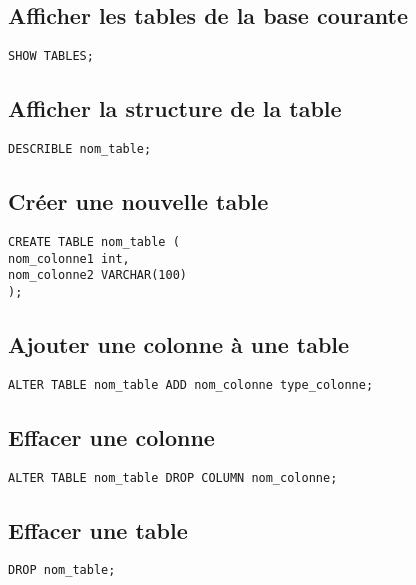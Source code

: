 \documentclass[11pt]{article}
\begin{document}
\subsection{Afficher les tables de la base courante}
\label{sec:orge465068}

\begin{verbatim}
SHOW TABLES;
\end{verbatim}

\subsection{Afficher la structure de la table}
\label{sec:org18c8266}

\begin{verbatim}
DESCRIBLE nom_table;
\end{verbatim}

\subsection{Créer une nouvelle table}
\label{sec:org65439d1}

\begin{verbatim}
CREATE TABLE nom_table (
nom_colonne1 int,
nom_colonne2 VARCHAR(100)
);
\end{verbatim}

\subsection{Ajouter une colonne à une table}
\label{sec:orgebeb21c}
\begin{verbatim}
ALTER TABLE nom_table ADD nom_colonne type_colonne;
\end{verbatim}

\subsection{Effacer une colonne}
\label{sec:org12fdc5a}
\begin{verbatim}
ALTER TABLE nom_table DROP COLUMN nom_colonne;
\end{verbatim}

\subsection{Effacer une table}
\label{sec:org7f8bf04}
\begin{verbatim}
DROP nom_table;
\end{verbatim}
\end{document}
